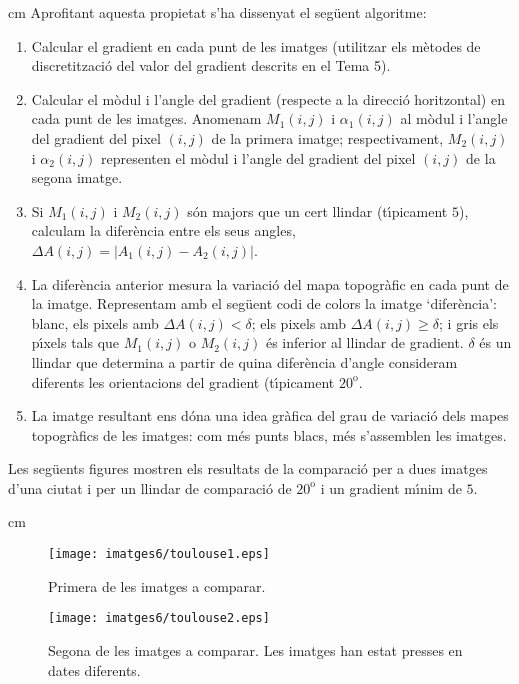 \documentclass{article}
\begin{document}
 cm
\noindent
Aprofitant aquesta propietat s'ha dissenyat el seg\"uent algoritme:
\begin{enumerate}
\item Calcular el gradient en cada punt de les imatges (utilitzar els m\`etodes de discretitzaci\'o del
valor del gradient descrits en el Tema 5).
\item Calcular el m\`odul i l'angle del gradient (respecte a la direcci\'o horitzontal) en cada punt de les
imatges. Anomenam $M_1(i, j)$ i $\alpha_1(i, j)$ al m\`odul i l'angle del gradient del pixel $(i, j)$ de la 
primera imatge; respectivament, $M_2(i, j)$ i $\alpha_2(i, j)$ representen el 
m\`odul i l'angle del gradient del pixel $(i, j)$ de la segona imatge. 
\item Si $M_1(i, j)$ i $M_2(i, j)$ s\'on majors que un cert llindar (t\'\i picament $5$), calculam 
la difer\`encia entre els seus angles, $\Delta A (i, j)=|A_1(i, j)-A_2(i, j)|$.
\item La difer\`encia anterior mesura la variaci\'o del mapa topogr\`afic en cada punt de la imatge.
Representam amb el seg\"uent codi de colors la imatge `difer\`encia': blanc, els pixels amb 
$\Delta A (i, j) < \delta$; els pixels amb $\Delta A (i, j) \geq \delta$; i gris els p\'\i xels tals
que $M_1(i, j)$ o $M_2(i, j)$ \'es inferior al llindar de gradient. $\delta$ \'es un llindar que
determina a partir de quina difer\`encia d'angle consideram diferents les orientacions del gradient
(t\'\i picament $20^\text{o}$.
\item La imatge resultant ens d\'ona una idea gr\`afica del grau de variaci\'o dels mapes topogr\`afics
de les imatges: com m\'es punts blacs, m\'es s'assemblen les imatges.
\end{enumerate}


Les seg\"uents figures mostren els resultats de la comparaci\'o per a dues imatges d'una ciutat i per
un llindar de comparaci\'o de $20^\text{o}$ i un gradient m\'\i nim de $5$.

 cm

\begin{figure}[htbp]
\begin{center}
\texttt{[image: imatges6/toulouse1.eps]}
\end{center}
\caption{Primera de les imatges a comparar.}
\label{fig_changes_orig1}
\end{figure}

\begin{figure}[htbp]
\begin{center}
\texttt{[image: imatges6/toulouse2.eps]}
\end{center}
\caption{Segona de les imatges a comparar. Les imatges han estat presses en dates diferents.}
\label{fig_changes_orig2}
\end{figure}
\end{document}
